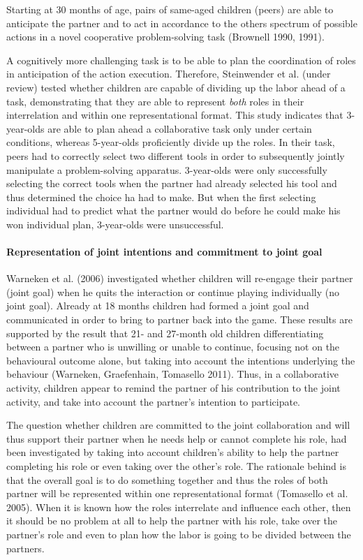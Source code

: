 \documentclass{article}
\begin{document}
Starting at 30 months of age, pairs of same-aged children (peers) are
able to anticipate the partner and to act in accordance to the others spectrum
of possible actions in a novel cooperative problem-solving task (Brownell 1990,
1991). 

A cognitively more challenging task is to be able to plan the
coordination of roles in anticipation of the action execution. Therefore,
Steinwender et al. (under review) tested whether children are capable of
dividing up the labor ahead of a task, demonstrating that they are able to
represent \emph{both} roles in their interrelation and within one
representational format. This study indicates that 3-year-olds are able to plan
ahead a collaborative task only under certain conditions, whereas 5-year-olds
proficiently divide up the roles. In their task, peers had to correctly select
two different tools in order to subsequently jointly manipulate a
problem-solving apparatus. 3-year-olds were only successfully selecting the
correct tools when the partner had already selected his tool and thus
determined the choice ha had to make. But when the first selecting individual
had to predict what the partner would do before he could make his won
individual plan, 3-year-olds were unsuccessful.

\paragraph{Representation of joint intentions and commitment to joint goal}

Warneken et al. (2006) investigated whether children will re-engage their
partner (joint goal) when he quits the interaction or continue playing
individually (no joint goal). Already at 18 months children had formed a joint
goal and communicated in order to bring to partner back into the game. These
results are supported by the result that 21- and 27-month old children
differentiating between a partner who is unwilling or unable to continue,
focusing not on the behavioural outcome alone, but taking into account the
intentions underlying the behaviour (Warneken, Graefenhain, Tomasello 2011).
Thus, in a collaborative activity, children appear to remind the partner of his
contribution to the joint activity, and take into account the partner's
intention to participate.

The question whether children are committed to the joint collaboration
and will thus support their partner when he needs help or cannot complete his
role, had been investigated by taking into account children's ability to help
the partner completing his role or even taking over the other's role. The
rationale behind is that the overall goal is to do something together and thus
the roles of both partner will be represented within one representational
format (Tomasello et al. 2005). When it is known how the roles interrelate and
influence each other, then it should be no problem at all to help the partner
with his role, take over the partner's role and even to plan how the labor is
going to be divided between the partners.
\end{document}
